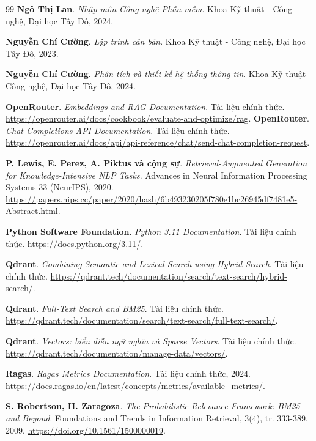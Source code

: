 \documentclass[12pt,a4paper,oneside]{report}
\begin{document}
\begin{thebibliography}{99}
  \textbf{Ngô Thị Lan}. \textit{Nhập môn Công nghệ Phần mềm}. Khoa Kỹ thuật - Công nghệ, Đại học Tây Đô, 2024.

  \textbf{Nguyễn Chí Cường}. \textit{Lập trình căn bản}. Khoa Kỹ thuật - Công nghệ, Đại học Tây Đô, 2023.

  \textbf{Nguyễn Chí Cường}. \textit{Phân tích và thiết kế hệ thống thông tin}. Khoa Kỹ thuật - Công nghệ, Đại học Tây Đô, 2024.

  \textbf{OpenRouter}. \textit{Embeddings and RAG Documentation}. Tài liệu chính thức. \url{https://openrouter.ai/docs/cookbook/evaluate-and-optimize/rag}.
  \textbf{OpenRouter}. \textit{Chat Completions API Documentation}. Tài liệu chính thức. \url{https://openrouter.ai/docs/api/api-reference/chat/send-chat-completion-request}.

  \textbf{P. Lewis, E. Perez, A. Piktus và cộng sự}. \textit{Retrieval-Augmented Generation for Knowledge-Intensive NLP Tasks}. Advances in Neural Information Processing Systems 33 (NeurIPS), 2020. \url{https://papers.nips.cc/paper/2020/hash/6b493230205f780e1bc26945df7481e5-Abstract.html}.

  \textbf{Python Software Foundation}. \textit{Python 3.11 Documentation}. Tài liệu chính thức. \url{https://docs.python.org/3.11/}.

  \textbf{Qdrant}. \textit{Combining Semantic and Lexical Search using Hybrid Search}. Tài liệu chính thức. \url{https://qdrant.tech/documentation/search/text-search/hybrid-search/}.

  \textbf{Qdrant}. \textit{Full-Text Search and BM25}. Tài liệu chính thức. \url{https://qdrant.tech/documentation/search/text-search/full-text-search/}.

  \textbf{Qdrant}. \textit{Vectors: biểu diễn ngữ nghĩa và Sparse Vectors}. Tài liệu chính thức. \url{https://qdrant.tech/documentation/manage-data/vectors/}.

  \textbf{Ragas}. \textit{Ragas Metrics Documentation}. Tài liệu chính thức, 2024. \url{https://docs.ragas.io/en/latest/concepts/metrics/available_metrics/}.

  \textbf{S. Robertson, H. Zaragoza}. \textit{The Probabilistic Relevance Framework: BM25 and Beyond}. Foundations and Trends in Information Retrieval, 3(4), tr. 333-389, 2009. \url{https://doi.org/10.1561/1500000019}.


\end{thebibliography}
\end{document}

